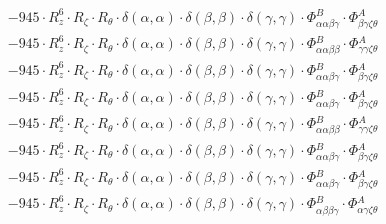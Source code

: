 \documentclass{article}
\begin{document}
\begin{subequations}
\begin{gather}
\begin{array}{c}
 \\[0.2em] 		 - 945 \cdot R_{z}^{6} \cdot R_{\zeta{}} \cdot R_{\theta{}} \cdot \delta{}\left(\alpha{}, \alpha{}\right) \cdot \delta{}\left(\beta{}, \beta{}\right) \cdot \delta{}\left(\gamma{}, \gamma{}\right) \cdot \Phi{}^{B}_{\alpha{}\alpha{}\beta{}\gamma{}} \cdot \Phi{}^{A}_{\beta{}\gamma{}\zeta{}\theta{}} 
 \\[0.2em] 		 - 945 \cdot R_{z}^{6} \cdot R_{\zeta{}} \cdot R_{\theta{}} \cdot \delta{}\left(\alpha{}, \alpha{}\right) \cdot \delta{}\left(\beta{}, \beta{}\right) \cdot \delta{}\left(\gamma{}, \gamma{}\right) \cdot \Phi{}^{B}_{\alpha{}\alpha{}\beta{}\beta{}} \cdot \Phi{}^{A}_{\gamma{}\gamma{}\zeta{}\theta{}} 
 \\[0.2em] 		 - 945 \cdot R_{z}^{6} \cdot R_{\zeta{}} \cdot R_{\theta{}} \cdot \delta{}\left(\alpha{}, \alpha{}\right) \cdot \delta{}\left(\beta{}, \beta{}\right) \cdot \delta{}\left(\gamma{}, \gamma{}\right) \cdot \Phi{}^{B}_{\alpha{}\alpha{}\beta{}\gamma{}} \cdot \Phi{}^{A}_{\beta{}\gamma{}\zeta{}\theta{}} 
 \\[0.2em] 		 - 945 \cdot R_{z}^{6} \cdot R_{\zeta{}} \cdot R_{\theta{}} \cdot \delta{}\left(\alpha{}, \alpha{}\right) \cdot \delta{}\left(\beta{}, \beta{}\right) \cdot \delta{}\left(\gamma{}, \gamma{}\right) \cdot \Phi{}^{B}_{\alpha{}\alpha{}\beta{}\gamma{}} \cdot \Phi{}^{A}_{\beta{}\gamma{}\zeta{}\theta{}} 
 \\[0.2em] 		 - 945 \cdot R_{z}^{6} \cdot R_{\zeta{}} \cdot R_{\theta{}} \cdot \delta{}\left(\alpha{}, \alpha{}\right) \cdot \delta{}\left(\beta{}, \beta{}\right) \cdot \delta{}\left(\gamma{}, \gamma{}\right) \cdot \Phi{}^{B}_{\alpha{}\alpha{}\beta{}\beta{}} \cdot \Phi{}^{A}_{\gamma{}\gamma{}\zeta{}\theta{}} 
 \\[0.2em] 		 - 945 \cdot R_{z}^{6} \cdot R_{\zeta{}} \cdot R_{\theta{}} \cdot \delta{}\left(\alpha{}, \alpha{}\right) \cdot \delta{}\left(\beta{}, \beta{}\right) \cdot \delta{}\left(\gamma{}, \gamma{}\right) \cdot \Phi{}^{B}_{\alpha{}\alpha{}\beta{}\gamma{}} \cdot \Phi{}^{A}_{\beta{}\gamma{}\zeta{}\theta{}} 
 \\[0.2em] 		 - 945 \cdot R_{z}^{6} \cdot R_{\zeta{}} \cdot R_{\theta{}} \cdot \delta{}\left(\alpha{}, \alpha{}\right) \cdot \delta{}\left(\beta{}, \beta{}\right) \cdot \delta{}\left(\gamma{}, \gamma{}\right) \cdot \Phi{}^{B}_{\alpha{}\alpha{}\beta{}\gamma{}} \cdot \Phi{}^{A}_{\beta{}\gamma{}\zeta{}\theta{}} 
 \\[0.2em] 		 - 945 \cdot R_{z}^{6} \cdot R_{\zeta{}} \cdot R_{\theta{}} \cdot \delta{}\left(\alpha{}, \alpha{}\right) \cdot \delta{}\left(\beta{}, \beta{}\right) \cdot \delta{}\left(\gamma{}, \gamma{}\right) \cdot \Phi{}^{B}_{\alpha{}\beta{}\beta{}\gamma{}} \cdot \Phi{}^{A}_{\alpha{}\gamma{}\zeta{}\theta{}} 

\end{array}
\end{gather}
\end{subequations}
\end{document}
